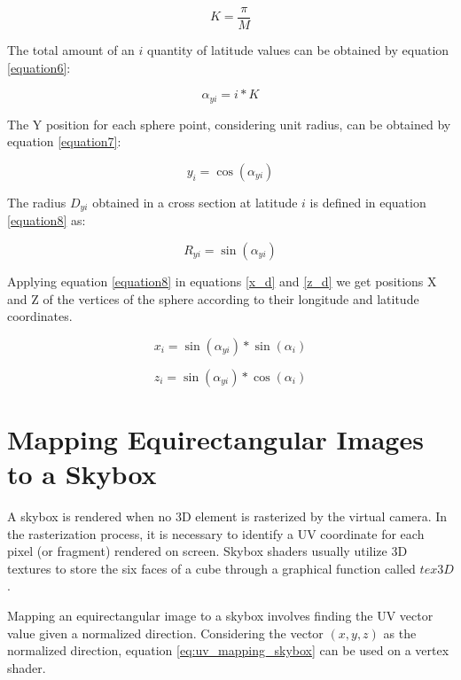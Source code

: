 \documentclass[12pt]{article}
\begin{document}
\begin{equation}
K = \frac{\pi}{M}
\label{equation5}
\end{equation}

The total amount of an $i$ quantity of latitude values can be obtained by equation \ref{equation6}:

\begin{equation}
\alpha_{yi} = i * K
\label{equation6}
\end{equation}

The Y position for each sphere point, considering unit radius, can be obtained by equation \ref{equation7}:

\begin{equation}
y_{i} = \cos(\alpha_{yi})
\label{equation7}
\end{equation}

The radius $D_{yi}$ obtained in a cross section at latitude $i$ is defined in equation \ref{equation8} as:

\begin{equation}
R_{yi} = \sin(\alpha_{yi})
\label{equation8}
\end{equation}

Applying equation \ref{equation8} in equations \ref{x_d} and \ref{z_d} we get  positions X and Z of the vertices of the sphere according to their longitude and latitude coordinates.

\begin{equation}
x_{i} = \sin(\alpha_{yi}) * \sin(\alpha_i)
\label{equation9}
\end{equation}

\begin{equation}
z_{i} = \sin(\alpha_{yi}) * \cos(\alpha_i)
\label{equation10}
\end{equation}

\section{Mapping Equirectangular Images to a Skybox}
A skybox is rendered when no 3D element is rasterized by the virtual camera. In the rasterization process, it is necessary to identify a UV coordinate for each pixel (or fragment) rendered on screen. Skybox shaders usually utilize 3D textures to store the six faces of a cube through a graphical function called $tex3D$.

Mapping an equirectangular image to a skybox involves finding the UV vector value given a normalized direction. Considering the vector $(x, y, z)$ as the normalized direction, equation \ref{eq:uv_mapping_skybox} can be used on a vertex shader.
\end{document}
